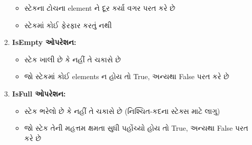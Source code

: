 \begin{enumerate}
  \begin{itemize}
  \tightlist
  \item
    સ્ટેકના ટોચના element ને દૂર કર્યા વગર પરત કરે છે
  \item
    સ્ટેકમાં કોઈ ફેરફાર કરતું નથી
  \end{itemize}

\begin{Shaded}
\begin{Highlighting}[]
     
        \NormalTok{ stack[}\OperatorTok{{-}}\NormalTok{]}
    \NormalTok{:}
        \NormalTok{(}\NormalTok{)}
         
\end{Highlighting}
\end{Shaded}
\item
  \textbf{IsEmpty ઓપરેશન:}

  \begin{itemize}
  \tightlist
  \item
    સ્ટેક ખાલી છે કે નહીં તે ચકાસે છે
  \item
    જો સ્ટેકમાં કોઈ elements ન હોય તો True, અન્યથા False પરત કરે છે
  \end{itemize}

\begin{Shaded}
\begin{Highlighting}[]
     \OperatorTok{==} 
\end{Highlighting}
\end{Shaded}
\item
  \textbf{IsFull ઓપરેશન:}

  \begin{itemize}
  \tightlist
  \item
    સ્ટેક ભરેલો છે કે નહીં તે ચકાસે છે (નિશ્ચિત-કદના સ્ટેક્સ માટે લાગુ)
  \item
    જો સ્ટેક તેની મહત્તમ ક્ષમતા સુધી પહોંચ્યો હોય તો True, અન્યથા False પરત કરે છે
  \end{itemize}

\begin{Shaded}
\begin{Highlighting}[]
     \OperatorTok{==}
\end{Highlighting}
\end{Shaded}
\end{enumerate}

